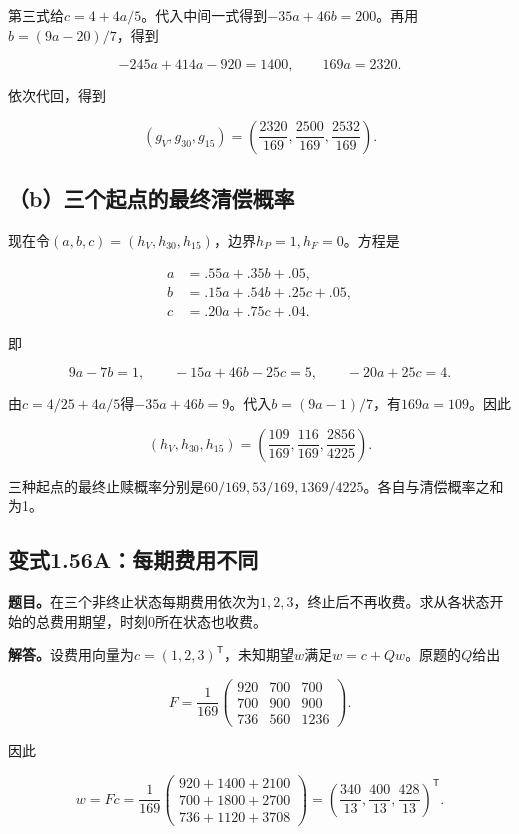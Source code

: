 \documentclass[
  11pt,a4paper,UTF8,fontset=fandol]{ctexart}
\begin{document}
第三式给\(c=4+4a/5\)。代入中间一式得到\(-35a+46b=200\)。再用\(b=(9a-20)/7\)，得到

\[
-245a+414a-920=1400,\qquad169a=2320.
\]

依次代回，得到

\[
\boxed{(g_V,g_{30},g_{15})=\left(\frac{2320}{169},\frac{2500}{169},\frac{2532}{169}\right).}
\]

\subsection{（b）三个起点的最终清偿概率}\label{bux4e09ux4e2aux8d77ux70b9ux7684ux6700ux7ec8ux6e05ux507fux6982ux7387}

现在令\((a,b,c)=(h_V,h_{30},h_{15})\)，边界\(h_P=1,h_F=0\)。方程是

\[
\begin{aligned}
a&=.55a+.35b+.05,\\
b&=.15a+.54b+.25c+.05,\\
c&=.20a+.75c+.04.
\end{aligned}
\]

即

\[
9a-7b=1,\qquad -15a+46b-25c=5,\qquad -20a+25c=4.
\]

由\(c=4/25+4a/5\)得\(-35a+46b=9\)。代入\(b=(9a-1)/7\)，有\(169a=109\)。因此

\[
\boxed{(h_V,h_{30},h_{15})=\left(\frac{109}{169},\frac{116}{169},\frac{2856}{4225}\right).}
\]

三种起点的最终止赎概率分别是\(60/169,53/169,1369/4225\)。各自与清偿概率之和为1。

\subsection{变式1.56A：每期费用不同}\label{ux53d8ux5f0f1.56aux6bcfux671fux8d39ux7528ux4e0dux540c}

\textbf{题目。}在三个非终止状态每期费用依次为\(1,2,3\)，终止后不再收费。求从各状态开始的总费用期望，时刻0所在状态也收费。

\textbf{解答。}设费用向量为\(c=(1,2,3)^{\mathsf T}\)，未知期望\(w\)满足\(w=c+Qw\)。原题的\(Q\)给出

\[
F=\frac1{169}\begin{pmatrix}920&700&700\\700&900&900\\736&560&1236\end{pmatrix}.
\]

因此

\[
w=Fc=\frac1{169}\begin{pmatrix}920+1400+2100\\700+1800+2700\\736+1120+3708\end{pmatrix}
=\boxed{\left(\frac{340}{13},\frac{400}{13},\frac{428}{13}\right)^{\mathsf T}}.
\]
\end{document}
